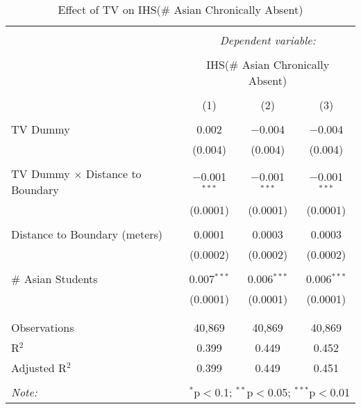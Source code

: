 
\begin{table}[!htbp] \centering 
  \caption{Effect of TV on IHS(\# Asian Chronically Absent)} 
  \label{} 
\begin{tabular}{@{\extracolsep{-2pt}}lccc} 
\\[-1.8ex]\hline 
\hline \\[-1.8ex] 
 & \multicolumn{3}{c}{\textit{Dependent variable:}} \\ 
\cline{2-4} 
\\[-1.8ex] & \multicolumn{3}{c}{IHS(\# Asian Chronically Absent)} \\ 
\\[-1.8ex] & (1) & (2) & (3)\\ 
\hline \\[-1.8ex] 
 TV Dummy & 0.002 & $-$0.004 & $-$0.004 \\ 
  & (0.004) & (0.004) & (0.004) \\ 
  & & & \\ 
 TV Dummy $\times$ Distance to Boundary & $-$0.001$^{***}$ & $-$0.001$^{***}$ & $-$0.001$^{***}$ \\ 
  & (0.0001) & (0.0001) & (0.0001) \\ 
  & & & \\ 
 Distance to Boundary (meters) & 0.0001 & 0.0003 & 0.0003 \\ 
  & (0.0002) & (0.0002) & (0.0002) \\ 
  & & & \\ 
 \# Asian Students & 0.007$^{***}$ & 0.006$^{***}$ & 0.006$^{***}$ \\ 
  & (0.0001) & (0.0001) & (0.0001) \\ 
  & & & \\ 
\hline \\[-1.8ex] 
Observations & 40,869 & 40,869 & 40,869 \\ 
R$^{2}$ & 0.399 & 0.449 & 0.452 \\ 
Adjusted R$^{2}$ & 0.399 & 0.449 & 0.451 \\ 
\hline 
\hline \\[-1.8ex] 
\textit{Note:}  & \multicolumn{3}{r}{$^{*}$p$<$0.1; $^{**}$p$<$0.05; $^{***}$p$<$0.01} \\ 
\end{tabular} 
\end{table} 
